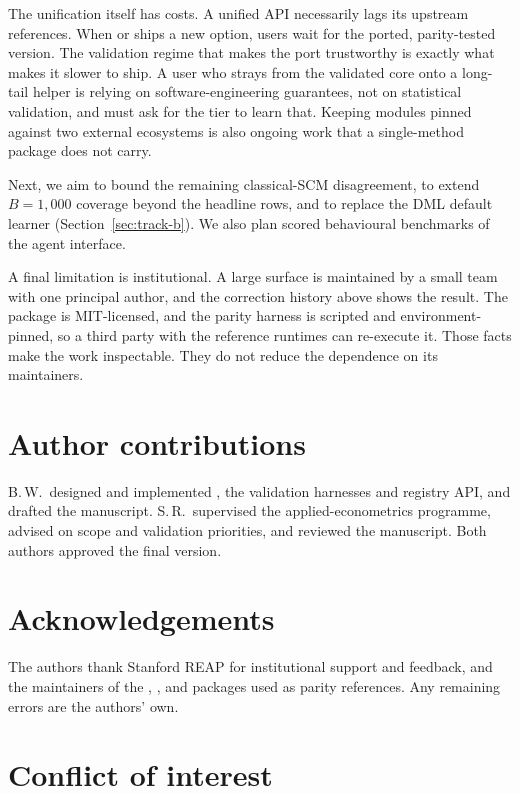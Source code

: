 The unification itself has costs. A unified API
necessarily lags its upstream references. When  or
 ships a new option, \statspai{} users wait for the ported,
parity-tested version. The validation regime that makes the port
trustworthy is exactly what makes it slower to ship. A user who strays
from the validated core onto a long-tail helper is relying on
software-engineering guarantees, not on statistical validation, and must ask
for the tier to learn that. Keeping \RParityModuleCount{} modules pinned
against two external ecosystems is also ongoing work that a single-method
package does not carry.

Next, we aim to bound the remaining classical-SCM disagreement, to extend
\(B=1{,}000\) coverage beyond the headline rows, and to replace the DML default
learner (Section~\ref{sec:track-b}). We also plan scored behavioural benchmarks
of the agent interface.

A final limitation is institutional. A large surface is maintained by a small
team with one principal author, and the correction history above shows the
result. The package is MIT-licensed, and the parity harness is scripted and
environment-pinned, so a third party with the reference runtimes can re-execute
it. Those facts make the work inspectable. They do not reduce the dependence on
its maintainers.

\section*{Author contributions}

B.\,W.\ designed and implemented \statspai{}, the validation harnesses
and registry API, and drafted the manuscript. S.\,R.\ supervised the
applied-econometrics programme, advised on scope and validation priorities,
and reviewed the manuscript. Both authors approved the final version.

\section*{Acknowledgements}

The authors thank Stanford REAP for institutional support and feedback,
and the maintainers of the , , and
 packages used as parity references. Any remaining
errors are the authors' own.

\section*{Conflict of interest}

